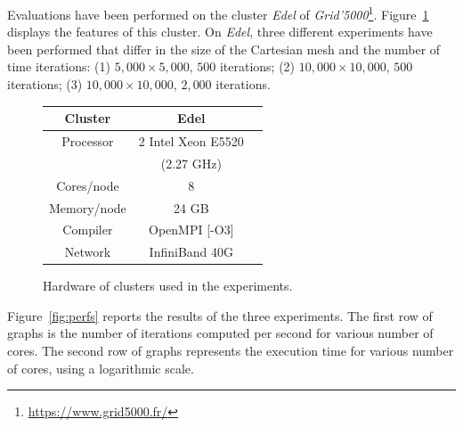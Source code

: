 Evaluations have been performed on the cluster \emph{Edel} of \emph{Grid'5000}\footnote{\url{https://www.grid5000.fr/}}. Figure~\ref{tab:hard} displays the features of this cluster. On \emph{Edel}, three different experiments have been performed that differ in the size of the Cartesian mesh and the number of time iterations: (1) $5,000 \times 5,000$, $500$ iterations; (2) $10,000 \times 10,000$, $500$ iterations; (3) $10,000 \times 10,000$, $2,000$ iterations.

\begin{figure}[!h]
\begin{center}
 \begin{tabular}{|c|c|c|}
    \hline
    Cluster & \textbf{Edel}\\
    \hline         
    Processor & 2 Intel Xeon E5520\\
    & (2.27 GHz)\\
    Cores/node & 8 \\
    Memory/node & 24 GB \\
    Compiler & OpenMPI [-O3] \\
    Network & InfiniBand 40G\\
    \hline
 \end{tabular}
   \caption{\label{tab:hard}Hardware of clusters used in the experiments.}
 \end{center}
\end{figure}

Figure~\ref{fig:perfs} reports the results of the three experiments. The first row of graphs is the number of iterations computed per second for various number of cores. The second row of graphs represents the execution time for various number of cores, using a logarithmic scale.

